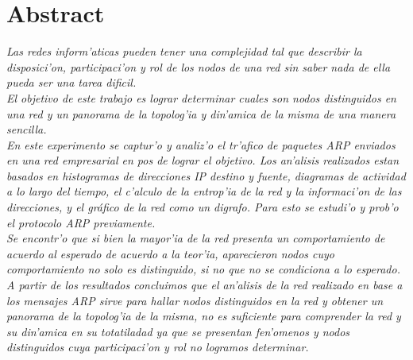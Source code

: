 \documentclass[a4paper,10pt]{article}
\begin{document}
\section*{\centering Abstract}
{\em
Las redes inform'aticas pueden tener una complejidad tal que describir la disposici'on, participaci'on y rol de los nodos de una red sin saber nada de ella pueda ser una tarea dificil.	\\
\indent	El objetivo de este trabajo es lograr determinar cuales son nodos distinguidos en una red y un panorama de la topolog'ia y din'amica de la misma de una manera sencilla.	\\
\indent	En este experimento se captur'o y analiz'o el tr'afico de paquetes ARP enviados en una red empresarial en pos de lograr el objetivo. Los an'alisis realizados estan basados en histogramas de direcciones IP destino y fuente, diagramas de actividad a lo largo del tiempo, el c'alculo de la entrop'ia de la red y la informaci'on de las direcciones, y el gráfico de la red como un digrafo. Para esto se estudi'o y prob'o el protocolo ARP previamente.	\\
\indent	Se encontr'o que si bien la mayor'ia de la red presenta un comportamiento de acuerdo al esperado de acuerdo a la teor'ia, aparecieron nodos cuyo comportamiento no solo es distinguido, si no que no se condiciona a lo esperado.	\\
\indent	A partir de los resultados concluimos que el an'alisis de la red realizado en base a los mensajes ARP sirve para hallar nodos distinguidos en la red y obtener un panorama de la topolog'ia de la misma, no es suficiente para comprender la red y su din'amica en su totatiladad ya que se presentan fen'omenos y nodos distinguidos cuya participaci'on y rol no logramos determinar.
}
\vspace*{5 mm}
\end{document}
